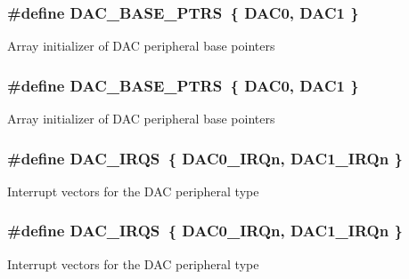 \subsubsection[{\texorpdfstring{D\+A\+C\+\_\+\+B\+A\+S\+E\+\_\+\+P\+T\+RS}{DAC_BASE_PTRS}}]{\setlength{\rightskip}{0pt plus 5cm}\#define D\+A\+C\+\_\+\+B\+A\+S\+E\+\_\+\+P\+T\+RS~\{ {\bf D\+A\+C0}, {\bf D\+A\+C1} \}}\hypertarget{group__DAC__Peripheral__Access__Layer_gab47690040e4d63adc4f324358c27157a}{}\label{group__DAC__Peripheral__Access__Layer_gab47690040e4d63adc4f324358c27157a}
Array initializer of D\+AC peripheral base pointers 
\subsubsection[{\texorpdfstring{D\+A\+C\+\_\+\+B\+A\+S\+E\+\_\+\+P\+T\+RS}{DAC_BASE_PTRS}}]{\setlength{\rightskip}{0pt plus 5cm}\#define D\+A\+C\+\_\+\+B\+A\+S\+E\+\_\+\+P\+T\+RS~\{ {\bf D\+A\+C0}, {\bf D\+A\+C1} \}}\hypertarget{group__DAC__Peripheral__Access__Layer_gab47690040e4d63adc4f324358c27157a}{}\label{group__DAC__Peripheral__Access__Layer_gab47690040e4d63adc4f324358c27157a}
Array initializer of D\+AC peripheral base pointers 
\subsubsection[{\texorpdfstring{D\+A\+C\+\_\+\+I\+R\+QS}{DAC_IRQS}}]{\setlength{\rightskip}{0pt plus 5cm}\#define D\+A\+C\+\_\+\+I\+R\+QS~\{ {\bf D\+A\+C0\+\_\+\+I\+R\+Qn}, {\bf D\+A\+C1\+\_\+\+I\+R\+Qn} \}}\hypertarget{group__DAC__Peripheral__Access__Layer_gac003cc87c636841f96fbf9084f536c43}{}\label{group__DAC__Peripheral__Access__Layer_gac003cc87c636841f96fbf9084f536c43}
Interrupt vectors for the D\+AC peripheral type 
\subsubsection[{\texorpdfstring{D\+A\+C\+\_\+\+I\+R\+QS}{DAC_IRQS}}]{\setlength{\rightskip}{0pt plus 5cm}\#define D\+A\+C\+\_\+\+I\+R\+QS~\{ {\bf D\+A\+C0\+\_\+\+I\+R\+Qn}, {\bf D\+A\+C1\+\_\+\+I\+R\+Qn} \}}\hypertarget{group__DAC__Peripheral__Access__Layer_gac003cc87c636841f96fbf9084f536c43}{}\label{group__DAC__Peripheral__Access__Layer_gac003cc87c636841f96fbf9084f536c43}
Interrupt vectors for the D\+AC peripheral type 